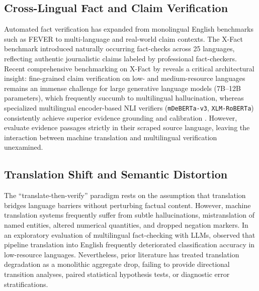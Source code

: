\subsection{Cross-Lingual Fact and Claim Verification}
Automated fact verification has expanded from monolingual English benchmarks such as FEVER \citep{thorne-etal-2018-fever} to multi-language and real-world claim contexts. The X-Fact benchmark \citep{gupta-srikumar-2021-xfact} introduced naturally occurring fact-checks across 25 languages, reflecting authentic journalistic claims labeled by professional fact-checkers. Recent comprehensive benchmarking on X-Fact by \citet{shcharbakova-etal-2025-scale} reveals a critical architectural insight: fine-grained claim verification on low- and medium-resource languages remains an immense challenge for large generative language models (7B--12B parameters), which frequently succumb to multilingual hallucination, whereas specialized multilingual encoder-based NLI verifiers (\texttt{mDeBERTa-v3}, \texttt{XLM-RoBERTa}) consistently achieve superior evidence grounding and calibration \citep{he-etal-2021-deberta,laurer-etal-2024-less}. However, \citet{shcharbakova-etal-2025-scale} evaluate evidence passages strictly in their scraped source language, leaving the interaction between machine translation and multilingual verification unexamined.

\subsection{Translation Shift and Semantic Distortion}
The ``translate-then-verify'' paradigm rests on the assumption that translation bridges language barriers without perturbing factual content. However, machine translation systems \citep{tiedemann-thottingal-2020-opus} frequently suffer from subtle hallucinations, mistranslation of named entities, altered numerical quantities, and dropped negation markers. In an exploratory evaluation of multilingual fact-checking with LLMs, \citet{singhal-etal-2024-comparative} observed that pipeline translation into English frequently deteriorated classification accuracy in low-resource languages. Nevertheless, prior literature has treated translation degradation as a monolithic aggregate drop, failing to provide directional transition analyses, paired statistical hypothesis tests, or diagnostic error stratifications.

